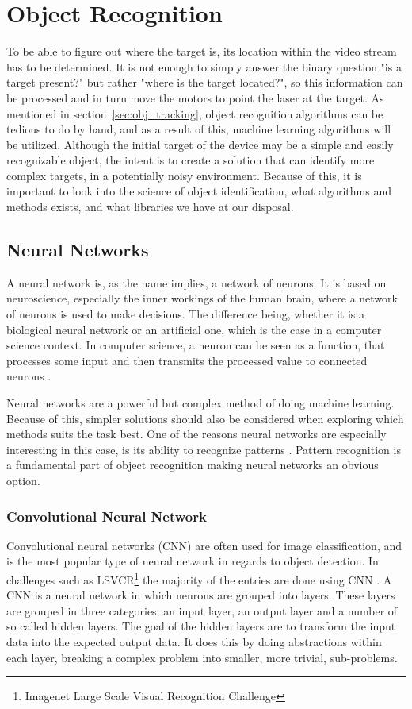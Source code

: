 \section{Object Recognition}
To be able to figure out where the target is, its location within the video stream has to be determined.
It is not enough to simply answer the binary question "is a target present?" but rather "where is the target located?", so this information can be processed and in turn move the motors to point the laser at the target.
As mentioned in section~\ref{sec:obj_tracking}, object recognition algorithms can be tedious to do by hand, and as a result of this, machine learning algorithms will be utilized.
Although the initial target of the device may be a simple and easily recognizable object, the intent is to create a solution that can identify more complex targets, in a potentially noisy environment.
Because of this, it is important to look into the science of object identification, what algorithms and methods exists, and what libraries we have at our disposal.

\subsection{Neural Networks}

A neural network is, as the name implies, a network of neurons.
It is based on neuroscience, especially the inner workings of the human brain, where a network of neurons is used to make decisions.
The difference being, whether it is a biological neural network or an artificial one, which is the case in a computer science context.
In computer science, a neuron can be seen as a function, that processes some input and then transmits the processed value to connected neurons \cite{ANN}.

Neural networks are a powerful but complex method of doing machine learning.
Because of this, simpler solutions should also be considered when exploring which methods suits the task best.
One of the reasons neural networks are especially interesting in this case, is its ability to recognize patterns \cite{ANN}.
Pattern recognition is a fundamental part of object recognition making neural networks an obvious option.


\subsubsection{Convolutional Neural Network}
Convolutional neural networks (CNN) are often used for image classification, and is the most popular type of neural network in regards to object detection\cite{CNN}.
In challenges such as LSVCR\footnote{Imagenet Large Scale Visual Recognition Challenge} the majority of the entries are done using CNN \cite{ILSVRC_Results}.  
A CNN is a neural network in which neurons are grouped into layers.
These layers are grouped in three categories; an input layer, an output layer and a number of so called hidden layers.
The goal of the hidden layers are to transform the input data into the expected output data.
It does this by doing abstractions within each layer, breaking a complex problem into smaller, more trivial, sub-problems.

